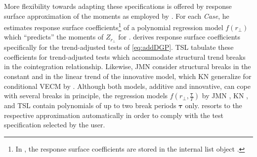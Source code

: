 More flexibility towards adapting these specifications is offered by response surface approximation of the moments as employed by \citet{Doornik1998}. For each \textit{Case}, he estimates response surface coefficients\footnote{In , the response surface coefficients are stored in the internal list object .} of a polynomial regression model $ f(r_\perp) $ which ``predicts'' the moments of $ Z_{r_\perp} $ for \citet{Johansen1996}. \citet{Trenkler2008} derives response surface coefficients specifically for the trend-adjusted tests of \eqref{eq:addDGP}. TSL \citeyearpar{TrenklerEtAl2008} tabulate these coefficients for trend-adjusted tests which accommodate structural trend breaks in the cointegration relationship. Likewise, JMN \citeyearpar{JohansenEtAl2000} consider structural breaks in the constant and in the linear trend of the innovative model, which KN \citeyearpar{KuritaNielsen2019} generalize for conditional VECM by \citet[Ch.~9]{Doornik1998}. Although both models, additive and innovative, can cope with several breaks in principle, the regression models $ f \left(r_\perp, \frac{\boldsymbol{\tau}}{T} \right) $ by JMN \citeyearpar{JohansenEtAl2000}, KN \citeyearpar{KuritaNielsen2019}, and TSL \citeyearpar{TrenklerEtAl2008} contain polynomials of up to two break periods $ \boldsymbol{\tau} $ only.  resorts to the respective approximation automatically in order to comply with the test specification selected by the user.



